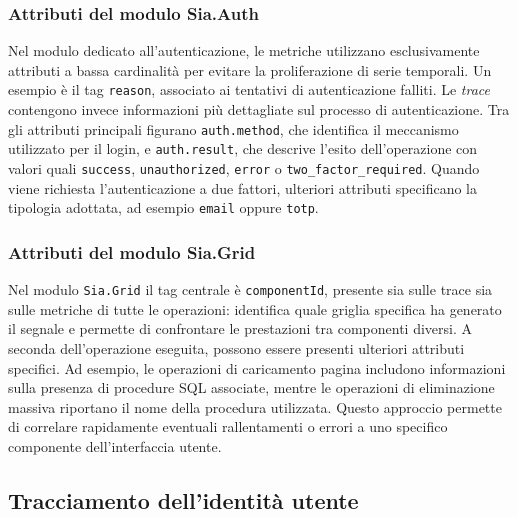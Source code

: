 \subsubsection{Attributi del modulo Sia.Auth}

Nel modulo dedicato all'autenticazione, le metriche utilizzano esclusivamente attributi a bassa cardinalità per evitare la proliferazione di serie temporali. Un esempio è il tag \texttt{reason}, associato ai tentativi di autenticazione falliti.
Le \emph{trace} contengono invece informazioni più dettagliate sul processo di autenticazione. Tra gli attributi principali figurano \texttt{auth.method}, che identifica il meccanismo utilizzato per il login, e \texttt{auth.result}, che descrive l'esito dell'operazione con valori quali \texttt{success}, \texttt{unauthorized}, \texttt{error} o \texttt{two\_factor\_required}. Quando viene richiesta l'autenticazione a due fattori, ulteriori attributi specificano la tipologia adottata, ad esempio \texttt{email} oppure \texttt{totp}.

\subsubsection{Attributi del modulo Sia.Grid}

Nel modulo \texttt{Sia.Grid} il tag centrale è \texttt{componentId}, presente
sia sulle trace sia sulle metriche di tutte le operazioni: identifica quale
griglia specifica ha generato il segnale e permette di confrontare le
prestazioni tra componenti diversi.
A seconda dell'operazione eseguita, possono essere presenti ulteriori attributi specifici. Ad esempio, le operazioni di caricamento pagina includono informazioni sulla presenza di procedure SQL associate, mentre le operazioni di eliminazione massiva riportano il nome della procedura utilizzata. Questo approccio permette di correlare rapidamente eventuali rallentamenti o errori a uno specifico componente dell'interfaccia utente.

\subsection{Tracciamento dell'identità utente}
\label{sec:modello-enduser}

